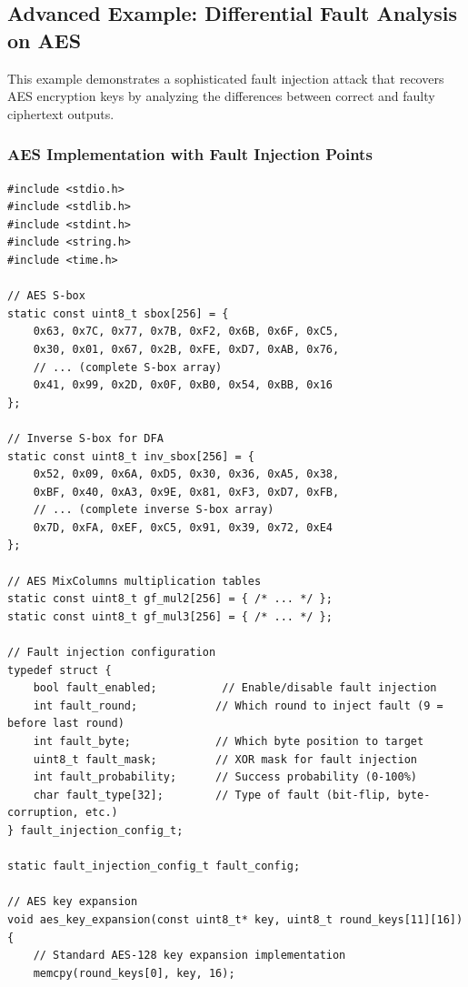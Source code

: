 \documentclass[12pt,a4paper]{article}
\begin{document}
\subsection{Advanced Example: Differential Fault Analysis on AES}

This example demonstrates a sophisticated fault injection attack that recovers AES encryption keys by analyzing the differences between correct and faulty ciphertext outputs.

\subsubsection{AES Implementation with Fault Injection Points}

\begin{lstlisting}[caption={AES Implementation with Controlled Fault Injection}]
#include <stdio.h>
#include <stdlib.h>
#include <stdint.h>
#include <string.h>
#include <time.h>

// AES S-box
static const uint8_t sbox[256] = {
    0x63, 0x7C, 0x77, 0x7B, 0xF2, 0x6B, 0x6F, 0xC5,
    0x30, 0x01, 0x67, 0x2B, 0xFE, 0xD7, 0xAB, 0x76,
    // ... (complete S-box array)
    0x41, 0x99, 0x2D, 0x0F, 0xB0, 0x54, 0xBB, 0x16
};

// Inverse S-box for DFA
static const uint8_t inv_sbox[256] = {
    0x52, 0x09, 0x6A, 0xD5, 0x30, 0x36, 0xA5, 0x38,
    0xBF, 0x40, 0xA3, 0x9E, 0x81, 0xF3, 0xD7, 0xFB,
    // ... (complete inverse S-box array)
    0x7D, 0xFA, 0xEF, 0xC5, 0x91, 0x39, 0x72, 0xE4
};

// AES MixColumns multiplication tables
static const uint8_t gf_mul2[256] = { /* ... */ };
static const uint8_t gf_mul3[256] = { /* ... */ };

// Fault injection configuration
typedef struct {
    bool fault_enabled;          // Enable/disable fault injection
    int fault_round;            // Which round to inject fault (9 = before last round)
    int fault_byte;             // Which byte position to target
    uint8_t fault_mask;         // XOR mask for fault injection
    int fault_probability;      // Success probability (0-100%)
    char fault_type[32];        // Type of fault (bit-flip, byte-corruption, etc.)
} fault_injection_config_t;

static fault_injection_config_t fault_config;

// AES key expansion
void aes_key_expansion(const uint8_t* key, uint8_t round_keys[11][16]) {
    // Standard AES-128 key expansion implementation
    memcpy(round_keys[0], key, 16);
    

\end{lstlisting}
\end{document}
